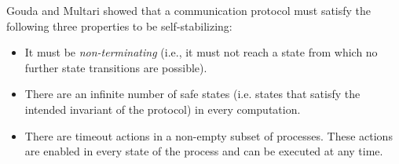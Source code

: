 {Gouda and Multari showed that a communication protocol must satisfy the following three properties to be self-stabilizing:\ns
\begin{itemize}
	\item It must be \textit{non-terminating} (i.e., it must not reach a state from which no further state transitions are possible).
   \item There are an infinite number of safe states (i.e. states that satisfy the intended invariant of the protocol) in every computation.
	\item There are timeout actions in a non-empty subset of processes. These actions are enabled in every state of the process and can be executed at any time.
\end{itemize}}
